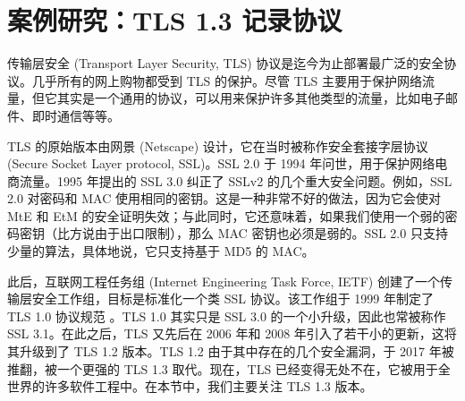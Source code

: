 \section{案例研究：TLS 1.3 记录协议}\label{sec:9-8}

传输层安全 (Transport Layer Security, TLS) 协议是迄今为止部署最广泛的安全协议。几乎所有的网上购物都受到 TLS 的保护。尽管 TLS 主要用于保护网络流量，但它其实是一个通用的协议，可以用来保护许多其他类型的流量，比如电子邮件、即时通信等等。

TLS 的原始版本由网景 (Netscape) 设计，它在当时被称作安全套接字层协议 (Secure Socket Layer protocol, SSL)。SSL 2.0 于 1994 年问世，用于保护网络电商流量。1995 年提出的 SSL 3.0 纠正了 SSLv2 的几个重大安全问题。例如，SSL 2.0 对密码和 MAC 使用相同的密钥。这是一种非常不好的做法，因为它会使对 MtE 和 EtM 的安全证明失效；与此同时，它还意味着，如果我们使用一个弱的密码密钥（比方说由于出口限制），那么 MAC 密钥也必须是弱的。SSL 2.0 只支持少量的算法，具体地说，它只支持基于 MD5 的 MAC。

此后，互联网工程任务组 (Internet Engineering Task Force, IETF) 创建了一个传输层安全工作组，目标是标准化一个类 SSL 协议。该工作组于 1999 年制定了 TLS 1.0 协议规范 \cite{dierks1999rfc2246}。TLS 1.0 其实只是 SSL 3.0 的一个小升级，因此也常被称作 SSL 3.1。在此之后，TLS 又先后在 2006 年和 2008 年引入了若干小的更新，这将其升级到了 TLS 1.2 版本。TLS 1.2 由于其中存在的几个安全漏洞，于 2017 年被推翻，被一个更强的 TLS 1.3 取代。现在，TLS 已经变得无处不在，它被用于全世界的许多软件工程中。在本节中，我们主要关注 TLS 1.3 版本。

